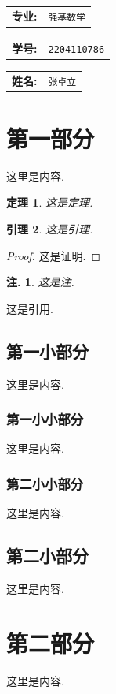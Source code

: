 \documentclass[12pt,a4paper,oneside]{ctexart}
\theoremstyle{nonumberplain}
\newtheorem{proof}{证明.}
\theoremstyle{plain}
\newtheorem{theorem}{定理}[section]
\theoremstyle{plain}
\newtheorem{lemma}[theorem]{引理}
\theoremstyle{nonumberplain}
\newtheorem{remark}{注.}
\theoremstyle{plain}
\theoremstyle{plain}
\theoremstyle{plain}
\theoremstyle{plain}
\begin{document}
\begin{titlepage}
\begin{center}
\begin{tabular}{rp{6cm}<{\centering}}
                \textbf{专业:}& \texttt{强基数学}\\
                \cline{2-2}
            \end{tabular}
        \end{center}
        \begin{center}
            \large
            \begin{tabular}{rp{6cm}<{\centering}}
                \textbf{学号:}& \texttt{2204110786}\\
                \cline{2-2}
            \end{tabular}
        \end{center}
        \begin{center}
            \large
            \begin{tabular}{rp{6cm}<{\centering}}
                \textbf{姓名:}& \texttt{张卓立}\\
                \cline{2-2}
            \end{tabular}
        \end{center}
    \end{titlepage}

    \newpage

    \tableofcontents

    \newpage

    \section{第一部分}
    这里是内容.
    \begin{theorem}
        这是定理.
    \end{theorem}

    \begin{lemma}
        这是引理.
    \end{lemma}

    \begin{proof}
        这是证明.
    \end{proof}
    
    \begin{remark}
        这是注.
    \end{remark}

    这是引用.\cite{薛庆超2019}

    \subsection{第一小部分}
    这里是内容.
    \subsubsection{第一小小部分}
    这里是内容.
    \subsubsection{第二小小部分}
    这里是内容.
    \subsection{第二小部分}
    这里是内容.
    \section{第二部分}
    这里是内容.

    \newpage
    
    
    
\end{document}
